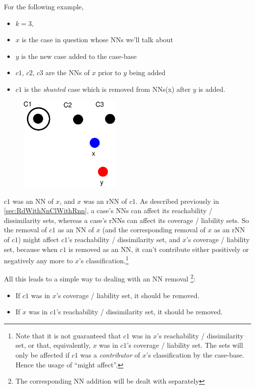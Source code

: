 \documentclass[a4paper,11pt]{report}
\begin{document}
For the following example,
\begin{itemize}
	\item $k=3$, 
	\item $x$ is the case in question whose NNs  we'll talk about
	\item $y$ is the new case added to the case-base
	\item $c1$, $c2$, $c3$ are the NNs of $x$ prior to $y$ being added
	\item $c1$ is the \emph{shunted} case which is removed from NNs(x) after $y$ is added.
\end{itemize}

\begin{figure}[h!] \centering
\includegraphics[width=5cm]{./Drawn/NnMightAffectEg}
\end{figure}

$c1$ was an NN of $x$, and $x$ was an rNN of $c1$. As described previously in \ref{sec:RdWithNnClWithRnn}, a case's NNs can affect its reachability / dissimilarity sets, whereas a case's rNNs can affect its coverage / liability sets. So the removal of $c1$ as an NN of $x$ (and the corresponding removal of $x$ as an rNN of $c1$) might affect $c1$'s reachability / dissimilarity set, and $x$'s coverage / liability set, because when $c1$ is removed as an NN, it can't contribute either positively or negatively any more to $x$'s classification.\footnote{Note that it is not guaranteed that $c1$ was in $x$'s reachability / dissimilarity set, or that, equivalently, $x$ was in $c1$'s coverage / liability set. The sets will only be affected if $c1$ was a \emph{contributor} of $x$'s classification by the case-base. Hence the usage of ``might affect''.}

All this leads to a simple way to dealing with an NN removal \footnote{The corresponding NN addition will be dealt with separately}:
\begin{itemize}
	\item If $c1$ was in $x$'s coverage / liability set, it should be removed.
	\item If $x$ was in $c1$'s reachability / dissimilarity set, it should be removed.
\end{itemize}
\end{document}
